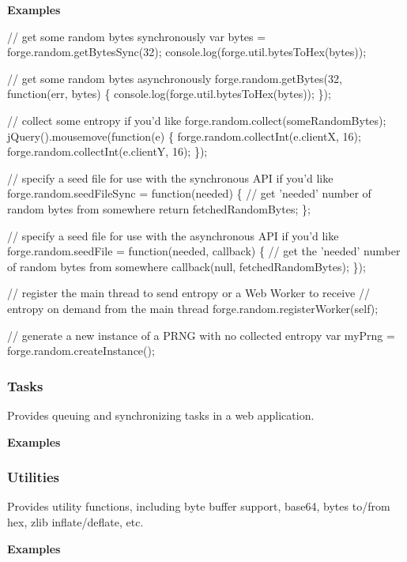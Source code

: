 {\bfseries Examples}


\begin{DoxyCode}
// get some random bytes synchronously
var bytes = forge.random.getBytesSync(32);
console.log(forge.util.bytesToHex(bytes));

// get some random bytes asynchronously
forge.random.getBytes(32, function(err, bytes) \{
  console.log(forge.util.bytesToHex(bytes));
\});

// collect some entropy if you'd like
forge.random.collect(someRandomBytes);
jQuery().mousemove(function(e) \{
  forge.random.collectInt(e.clientX, 16);
  forge.random.collectInt(e.clientY, 16);
\});

// specify a seed file for use with the synchronous API if you'd like
forge.random.seedFileSync = function(needed) \{
  // get 'needed' number of random bytes from somewhere
  return fetchedRandomBytes;
\};

// specify a seed file for use with the asynchronous API if you'd like
forge.random.seedFile = function(needed, callback) \{
  // get the 'needed' number of random bytes from somewhere
  callback(null, fetchedRandomBytes);
\});

// register the main thread to send entropy or a Web Worker to receive
// entropy on demand from the main thread
forge.random.registerWorker(self);

// generate a new instance of a PRNG with no collected entropy
var myPrng = forge.random.createInstance();
\end{DoxyCode}


\label{_task}%
 \subsubsection*{Tasks}

Provides queuing and synchronizing tasks in a web application.

{\bfseries Examples}


\begin{DoxyCode}
\end{DoxyCode}


\label{_util}%
 \subsubsection*{Utilities}

Provides utility functions, including byte buffer support, base64, bytes to/from hex, zlib inflate/deflate, etc.

{\bfseries Examples}



